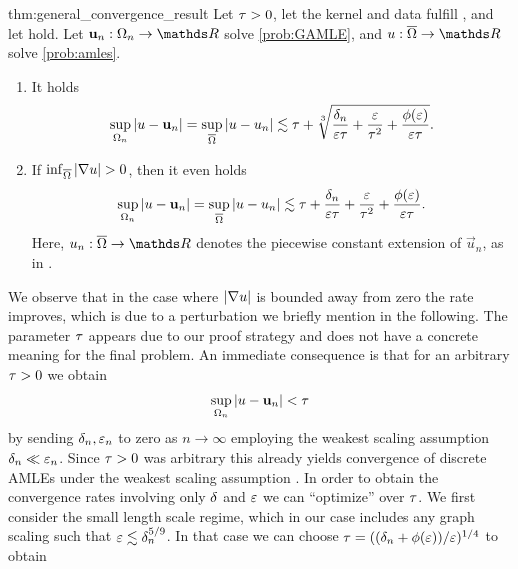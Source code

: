\begin{theorem}{\cite[Th. 2.2]{bungert2021uniform}}{thm:general_convergence_result}
Let $\tau>0$, let the kernel and data fulfill ,  and let  hold. Let $\vec u_n:\domain_n\to\R$ solve \cref{prob:GAMLE}, and $u:\closure\domain\to\R$ solve \cref{prob:amles}.
\begin{enumerate}
\item It holds 
\begin{align*}
    \sup_{\Omega_n}\left|u-\mathbf{u}_n\right| = \sup_{\overline{\Omega}}\left|u- u_n\right| \lesssim \tau +  \sqrt[3]{\frac{\delta_n}{\varepsilon\tau} + \frac{\varepsilon}{\tau^2}+\frac{\phi(\varepsilon)}{\varepsilon\tau}}.
\end{align*}
\item If $\inf_{\cl\domain}\abs{\nabla u}>0$, then it even holds 
\begin{align*}
\sup_{\Omega_n}\left|u-\mathbf{u}_n\right| = \sup_{\overline{\Omega}}\left|u- u_n\right| \lesssim \tau +  {\frac{\delta_n}{\varepsilon\tau} + \frac{\varepsilon}{\tau^2}+\frac{\phi(\varepsilon)}{\varepsilon\tau}}.
\end{align*}
%
Here, $u_n:\closure\domain\to\R$ denotes the piecewise constant extension of $\vec u_n$, as in .
\end{enumerate}
\end{theorem}
%
%
\noindent%
We observe that in the case where $\left|\nabla u\right|$ is bounded away from zero the rate improves, which is due to a perturbation we briefly mention in the following. The parameter $\tau$ appears due to our proof strategy and does not have a concrete meaning for the final problem. An immediate consequence is that for an arbitrary $\tau>0$ we obtain
%
\begin{align*}
\sup_{\Omega_n}\left|u-\mathbf{u}_n\right| < \tau
\end{align*}
%
by sending $\delta_n,\varepsilon_n$ to zero as $n\to\infty$ employing the weakest scaling assumption $\delta_n\ll \varepsilon_n$. Since $\tau >0$ was arbitrary this already yields convergence of discrete AMLEs under the weakest scaling assumption \cite[Cor. 2.3]{bungert2021uniform}. In order to obtain the convergence rates involving only $\delta$ and $\varepsilon$ we can \enquote{optimize} over $\tau$. We first consider the small length scale regime, which in our case includes any graph scaling such that $\varepsilon\lesssim \delta_n^{5/9}$. In that case we can choose $\tau = ((\delta_n + \phi(\varepsilon))/\varepsilon)^{1/4}$ to obtain
